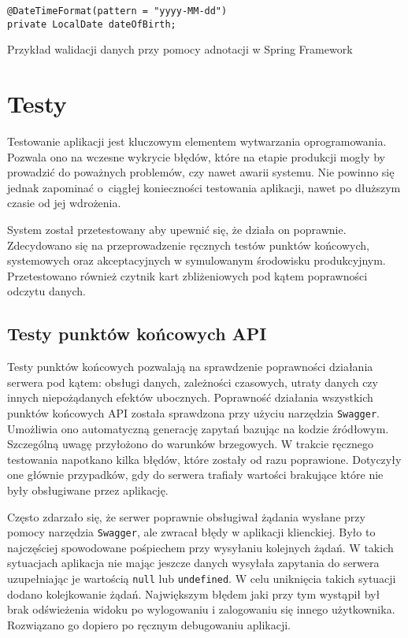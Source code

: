 \begin{listing}[H]
    \begin{verbatim}
@DateTimeFormat(pattern = "yyyy-MM-dd")
private LocalDate dateOfBirth;
\end{verbatim}
    \caption{Przykład walidacji danych przy pomocy adnotacji w Spring Framework}
    \label{lst:validation}
\end{listing}

\section{Testy}

Testowanie aplikacji jest kluczowym elementem wytwarzania oprogramowania. Pozwala ono na wczesne wykrycie błędów, które na etapie produkcji mogły by prowadzić do poważnych problemów, czy nawet awarii systemu. Nie powinno się jednak zapominać o~ciągłej konieczności testowania aplikacji, nawet po dłuższym czasie od jej wdrożenia.

System został przetestowany aby upewnić się, że działa on poprawnie. Zdecydowano się na przeprowadzenie ręcznych testów punktów końcowych, systemowych oraz akceptacyjnych w symulowanym środowisku produkcyjnym. Przetestowano również czytnik kart zbliżeniowych pod kątem poprawności odczytu danych.

\subsection{Testy punktów końcowych API}

Testy punktów końcowych pozwalają na sprawdzenie poprawności działania serwera pod kątem: obsługi danych, zależności czasowych, utraty danych czy innych niepożądanych efektów ubocznych. Poprawność działania wszystkich punktów końcowych API została sprawdzona przy użyciu narzędzia \texttt{Swagger}. Umożliwia ono automatyczną generację zapytań bazując na kodzie źródłowym. Szczególną uwagę przyłożono do warunków brzegowych. W trakcie ręcznego testowania napotkano kilka błędów, które zostały od razu poprawione. Dotyczyły one głównie przypadków, gdy do serwera trafiały wartości brakujące które nie były obsługiwane przez aplikację.

Często zdarzało się, że serwer poprawnie obsługiwał żądania wysłane przy pomocy narzędzia \texttt{Swagger}, ale zwracał błędy w aplikacji klienckiej. Było to najczęściej spowodowane pośpiechem przy wysyłaniu kolejnych żądań. W takich sytuacjach aplikacja nie mając jeszcze danych wysyłała zapytania do serwera uzupełniając je wartością \texttt{null} lub \texttt{undefined}. W celu uniknięcia takich sytuacji dodano kolejkowanie żądań. Największym błędem jaki przy tym wystąpił był brak odświeżenia widoku po wylogowaniu i zalogowaniu się innego użytkownika. Rozwiązano go dopiero po ręcznym debugowaniu aplikacji.


